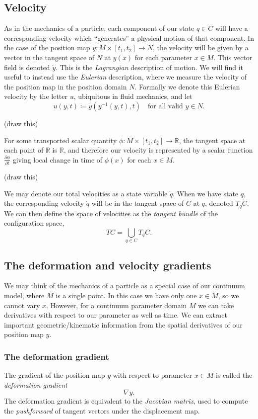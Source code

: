 \documentclass[11pt,a4paper]{memoir}
\newcommand{\Part}[2]{\frac{\partial #1}{\partial #2}}
\begin{document}
\subsection{Velocity}
As in the mechanics of a particle, each component of our state $q \in C$ will have a corresponding velocity which ``generates'' a physical motion of that component.
In the case of the position map $y : M \times [t_1, t_2] \rightarrow N$, the velocity will be given by
a vector in the tangent space of $N$ at $y(x)$ for each parameter $x \in M$. This vector field is denoted $\dot{y}$.
This is the \textit{Lagrangian} description of motion. We will find it useful to instead use the \textit{Eulerian} description, where we measure the velocity of the position map in the position domain $N$. Formally we denote this Eulerian velocity by the letter $u$, ubiquitous in fluid mechanics, and let
    $$u(y, t) \coloneqq \dot{y}(y^{-1}(y, t), t)\quad \text{for all valid $y\in N$.}$$

\vskip 0.2in
(draw this)
\vskip 0.2in

For some transported scalar quantity $\phi : M \times [t_1, t_2] \rightarrow \mathbb{R}$, the tangent space at each point of $\mathbb{R}$ is $\mathbb{R}$,
and therefore our velocity is represented by a scalar function $\Part{\phi}{t}$ giving local change in time of $\phi(x)$ for each $x \in M$.

\vskip 0.2in
(draw this)
\vskip 0.2in

We may denote our total velocities as a state variable $\dot{q}$. 
When we have state $q$, the corresponding velocity $\dot{q}$ will be in the tangent space of $C$ at $q$, denoted $T_q C$.
We can then define the space of velocities as the \textit{tangent bundle} of the configuration space,
    $$TC = \bigcup_{q \in C} T_q C.$$

\subsection{The deformation and velocity gradients}
We may think of the mechanics of a particle as a special case of our continuum model, where
$M$ is a single point. In this case we have only one $x \in M$, so we cannot vary $x$.
However, for a continuum parameter domain $M$ we can take derivatives with respect to our parameter as well as time.
We can extract important geometric/kinematic information from the spatial derivatives of our position map $y$.

\subsubsection{The deformation gradient}
The gradient of the position map $y$ with respect to parameter $x \in M$ is called the \textit{deformation gradient}
\begin{equation}\label{deformation_gradient}
    \nabla y.
\end{equation}
The deformation gradient is equivalent to the \textit{Jacobian matrix}, used to compute the \textit{pushforward}
of tangent vectors under the displacement map.
\end{document}
